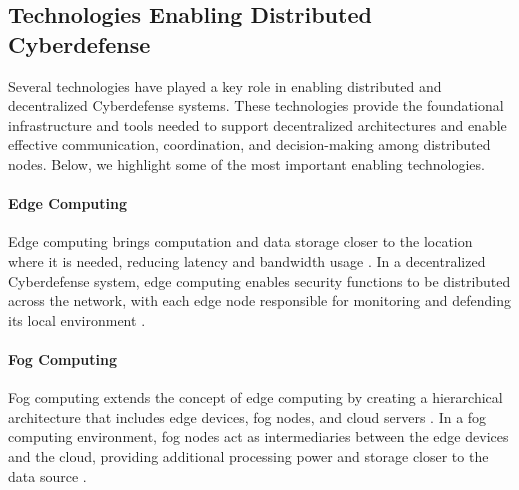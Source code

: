 


\subsection{Technologies Enabling Distributed Cyberdefense}

Several technologies have played a key role in enabling distributed and decentralized Cyberdefense systems. These technologies provide the foundational infrastructure and tools needed to support decentralized architectures and enable effective communication, coordination, and decision-making among distributed nodes. Below, we highlight some of the most important enabling technologies.

\paragraph{Edge Computing}

Edge computing brings computation and data storage closer to the location where it is needed, reducing latency and bandwidth usage \cite{Shi2016}. In a decentralized Cyberdefense system, edge computing enables security functions to be distributed across the network, with each edge node responsible for monitoring and defending its local environment \cite{Roman2018}.

\paragraph{Fog Computing}

Fog computing extends the concept of edge computing by creating a hierarchical architecture that includes edge devices, fog nodes, and cloud servers \cite{Bonomi2012}. In a fog computing environment, fog nodes act as intermediaries between the edge devices and the cloud, providing additional processing power and storage closer to the data source \cite{Mukherjee2017}.

